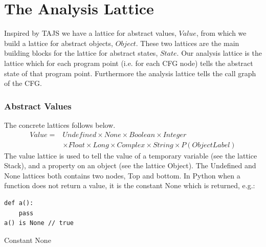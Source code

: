 \chapter{The Analysis Lattice}
Inspired by TAJS we have a lattice for abstract values, $Value$, from which we build a lattice for abstract objects, $Object$. These two lattices are the main building blocks for the lattice for abstract states, $State$. Our analysis lattice is the lattice which for each program point (i.e. for each CFG node) tells the abstract state of that program point. Furthermore the analysis lattice tells the call graph of the CFG.

\subsection{Abstract Values}
The concrete lattices follows below.
\begin{eqnarray*}
Value =& Undefined \times None \times Boolean \times Integer \\
       & \times Float \times Long \times Complex \times String \times P(ObjectLabel)
\end{eqnarray*}
The value lattice is used to tell the value of a temporary variable (see the lattice Stack), and a property on an object (see the lattice Object). The Undefined and None lattices both contains two nodes, Top and bottom. In Python when a function does not return a value, it is the constant None\cite{pyref.constants} which is returned, e.g.:
\begin{listing}[H]
	\begin{verbatim}
def a(): 
	pass
a() is None // true
	\end{verbatim}
	\caption{Constant None}\label{code:NoneExample}
\end{listing}

